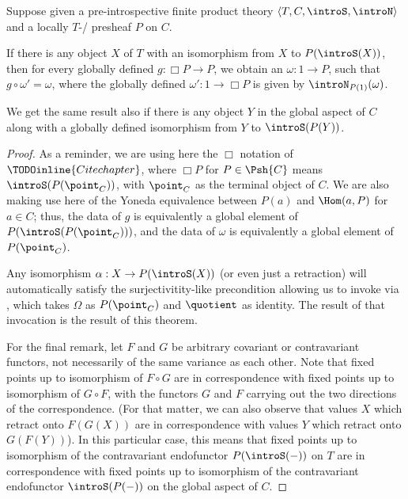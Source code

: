 \begin{theorem}\label{PreIntrospDiagFromIso}
Suppose given a pre-introspective finite product theory $\langle T, C, \introS, \introN \rangle$ and a locally $T$-\repsmall/ presheaf $P$  on $C$.

If there is any object $X$ of $T$ with an isomorphism from $X$ to $P(\introS(X))$, then for every globally defined $g : \Box P \to P$, we obtain an $\omega : 1 \to P$, such that $g \circ \omega' = \omega$, where the globally defined $\omega' : 1 \to \Box P$ is given by $\introN_{P(1)}(\omega)$. 

We get the same result also if there is any object $Y$ in the global aspect of $C$ along with a globally defined isomorphism from $Y$ to $\introS(P(Y))$.
\end{theorem}
\begin{proof}
As a reminder, we are using here the $\Box$ notation of $\TODOinline{Cite chapter}$, where $\Box P$ for $P \in \Psh{C}$ means $\introS(P(\point_C))$, with $\point_C$ as the terminal object of $C$. We are also making use here of the Yoneda equivalence between $P(a)$ and $\Hom(a, P)$ for $a \in C$; thus, the data of $g$ is equivalently a global element of $P(\introS(P(\point_C)))$, and the data of $\omega$ is equivalently a global element of $P(\point_C)$.

Any isomorphism $\alpha : X \to P(\introS(X))$ (or even just a retraction) will automatically satisfy the surjectivitity-like precondition allowing us to invoke  via , which takes $\Omega$ as $P(\point_C)$ and $\quotient$ as identity. The result of that invocation is the result of this theorem.

For the final remark, let $F$ and $G$ be arbitrary covariant or contravariant functors, not necessarily of the same variance as each other. Note that fixed points up to isomorphism of $F \circ G$ are in correspondence with fixed points up to isomorphism of $G \circ F$, with the functors $G$ and $F$ carrying out the two directions of the correspondence. (For that matter, we can also observe that values $X$ which retract onto $F(G(X))$ are in correspondence with values $Y$ which retract onto $G(F(Y))$). In this particular case, this means that fixed points up to isomorphism of the contravariant endofunctor $P(\introS(-))$ on $T$ are in correspondence with fixed points up to isomorphism of the contravariant endofunctor $\introS(P(-))$ on the global aspect of $C$.
\end{proof}

